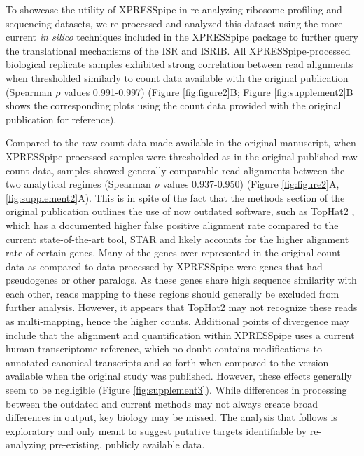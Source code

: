 \documentclass[10pt, oneside]{article}
\begin{document}
To showcase the utility of XPRESSpipe in re-analyzing ribosome profiling and sequencing datasets, we re-processed and analyzed this dataset using the more current \textit{in silico} techniques included in the XPRESSpipe package to further query the translational mechanisms of the ISR and ISRIB. All XPRESSpipe-processed biological replicate samples exhibited strong correlation between read alignments when thresholded similarly to count data available with the original publication (Spearman $\rho$ values 0.991-0.997) (Figure \ref{fig:figure2}B; Figure \ref{fig:supplement2}B shows the corresponding plots using the count data provided with the original publication for reference). \par

Compared to the raw count data made available in the original manuscript, when XPRESSpipe-processed samples were thresholded as in the original published raw count data, samples showed generally comparable read alignments between the two analytical regimes (Spearman $\rho$ values 0.937-0.950) (Figure \ref{fig:figure2}A, \ref{fig:supplement2}A). This is in spite of the fact that the methods section of the original publication outlines the use of now outdated software, such as TopHat2 \cite{tophat2}, which has a documented higher false positive alignment rate compared to the current state-of-the-art tool, STAR \cite{alignment_benchmark, star} and likely accounts for the higher alignment rate of certain genes. Many of the genes over-represented in the original count data as compared to data processed by XPRESSpipe were genes that had pseudogenes or other paralogs. As these genes share high sequence similarity with each other, reads mapping to these regions should generally be excluded from further analysis. However, it appears that TopHat2 may not recognize these reads as multi-mapping, hence the higher counts. Additional points of divergence may include that the alignment and quantification within XPRESSpipe uses a current human transcriptome reference, which no doubt contains modifications to annotated canonical transcripts and so forth when compared to the version available when the original study was published. However, these effects generally seem to be negligible (Figure \ref{fig:supplement3}). While differences in processing between the outdated and current methods may not always create broad differences in output, key biology may be missed. The analysis that follows is exploratory and only meant to suggest putative targets identifiable by re-analyzing pre-existing, publicly available data. \par
\end{document}
